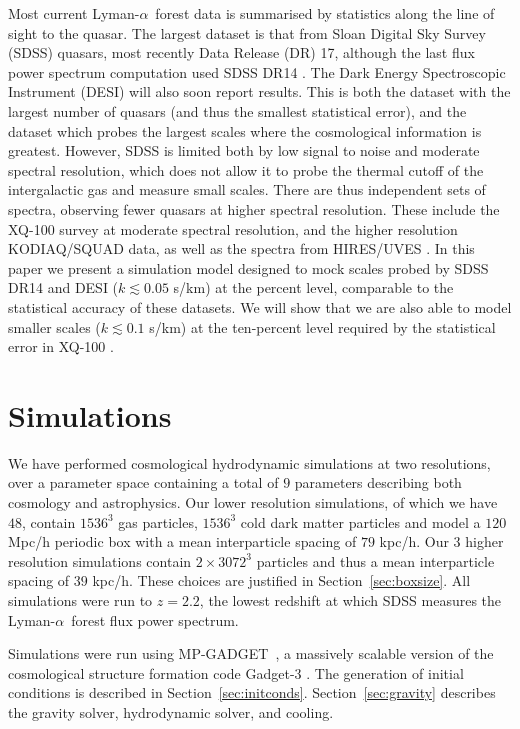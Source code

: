 \documentclass[a4paper,11pt]{article}
\newcommand{\Lya}{Lyman-$\alpha$}
\newcommand{\mpgadget}{{\small MP-GADGET}}
\begin{document}
Most current \Lya~forest data is summarised by statistics along the line of sight to the quasar. The largest dataset is that from Sloan Digital Sky Survey (SDSS) quasars, most recently Data Release (DR) 17, although the last flux power spectrum computation used SDSS DR14 \cite{Chabanier:2019}. The Dark Energy Spectroscopic Instrument (DESI) will also soon report results. This is both the dataset with the largest number of quasars (and thus the smallest statistical error), and the dataset which probes the largest scales where the cosmological information is greatest. However, SDSS is limited both by low signal to noise and moderate spectral resolution, which does not allow it to probe the thermal cutoff of the intergalactic gas and measure small scales. There are thus independent sets of spectra, observing fewer quasars at higher spectral resolution. These include the XQ-100 survey \cite{Irsic:2017pk, Esposito:2022} at moderate spectral resolution, and the higher resolution KODIAQ/SQUAD \cite{KODIAQ:2022} data, as well as the spectra from HIRES/UVES \cite{Viel:2013wdm, Boera:2019}. In this paper we present a simulation model designed to mock scales probed by SDSS DR14 and DESI ($k \lesssim 0.05$ s/km) at the percent level, comparable to the statistical accuracy of these datasets. We will show that we are also able to model smaller scales ($k \lesssim 0.1$ s/km) at the ten-percent level required by the statistical error in XQ-100 \cite{KODIAQ:2022}.

\section{Simulations}

We have performed cosmological hydrodynamic simulations at two resolutions, over a parameter space containing a total of $9$ parameters describing both cosmology and astrophysics. Our lower resolution simulations, of which we have $48$, contain $1536^3$ gas particles, $1536^3$ cold dark matter particles and model a $120$ Mpc/h periodic box with a mean interparticle spacing of $79$ kpc/h. Our $3$ higher resolution simulations contain $2\times 3072^3$ particles and thus a mean interparticle spacing of $39$ kpc/h. These choices are justified in Section~\ref{sec:boxsize}. All simulations were run to $z=2.2$, the lowest redshift at which SDSS measures the \Lya~forest flux power spectrum.

Simulations were run using \mpgadget~\cite{MPGadget2018, Bird:2022}, a massively scalable version of the cosmological structure formation code Gadget-3 \cite{Springel:2005}. The generation of initial conditions is described in Section~\ref{sec:initconds}. Section~\ref{sec:gravity} describes the gravity solver, hydrodynamic solver, and cooling.
\end{document}
